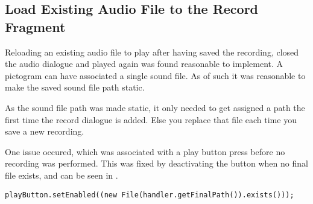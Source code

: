 \subsection{Load Existing Audio File to the Record Fragment}
Reloading an existing audio file to play after having saved the recording, closed the audio dialogue and played again was found reasonable to implement.
A pictogram can have associated a single sound file.
As of such it was reasonable to make the saved sound file path static.

As the sound file path was made static, it only needed to get assigned a path the first time the record dialogue is added. 
Else you replace that file each time you save a new recording.

One issue occured, which was associated with a play button press before no recording was performed.
This was fixed by deactivating the button when no final file exists, and can be seen in .

\begin{lstlisting}[label={lst:playbuttonpress},caption = {Activating or Deactivating playButton}]
playButton.setEnabled((new File(handler.getFinalPath()).exists()));
\end{lstlisting}